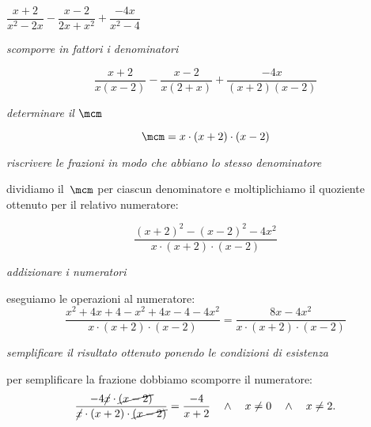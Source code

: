  \begin{esempio}
\(\dfrac{x+2}{x^{2}-2x}-\dfrac{x-2}{2x+x^{2}}+\dfrac{-4x}{x^{2}-4}\)
\begin{enumeratea}
 \item \emph{scomporre in fattori i denominatori}
 
  \[\frac{x+2}{x(x-2)}-\frac{x-2}{x(2+x)}+\frac{-4x}{(x+2)(x-2)}\]
  
 \item \emph{determinare il \(\mcm\)}
 
  \[\mcm = x\cdot (x+2) \cdot (x-2)\]
  

 \item \emph{riscrivere le frazioni in modo che abbiano lo stesso denominatore}
 
  dividiamo il~\(\mcm\) per ciascun denominatore e moltiplichiamo il 
  quoziente ottenuto per il relativo numeratore:
  
    \[\frac{(x+2)^{2}-(x-2)^{2}-4x^{2}}{x\cdot(x+2)\cdot(x-2)}\]
    
 \item \emph{addizionare i numeratori} 
 
  eseguiamo le operazioni al numeratore:
    \begin{equation*}
     \frac{x^{2}+4x+4-x^{2}+4x-4-4x^{2}}{x\cdot(x+2)\cdot(x-2)}=
     \frac{8x-4x^{2}}{x\cdot(x+2)\cdot(x-2)}
     \end{equation*}
     
 \item \emph{semplificare il risultato ottenuto ponendo le condizioni di 
  esistenza}
 
  per semplificare la frazione dobbiamo scomporre il numeratore:
    \begin{equation*}
    \frac{-4\cancel{x}\cdot\cancel{(x-2)}}
         {\cancel{x}\cdot(x+2)\cdot\cancel{(x-2)}}=
    \frac{-4}{x+2} \quad \wedge \quad x \neq 0 \quad \wedge \quad x \neq 2.
    \end{equation*}
\end{enumeratea}
 \end{esempio}

